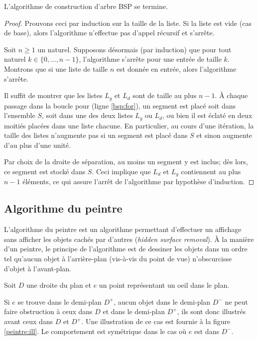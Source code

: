 \begin{prop}
  L'algorithme de construction d'arbre BSP se termine.
\end{prop}
\begin{proof}
  Prouvons ceci par induction sur la taille de la liste.
  Si la liste est vide (cas de base), alors l'algorithme n'effectue
  pas d'appel récursif et s'arrête.

  Soit $n\geq 1$ un naturel. Supposons désormais (par induction) que pour
  tout naturel $k\in\{0, \ldots, n-1\}$, l'algorithme s'arrête pour
  une entrée de taille $k$. Montrons que si une liste de taille $n$
  est donnée en entrée, alors l'algorithme s'arrête.

  Il suffit de montrer que les listes $L_g$ et $L_d$ sont de taille
  au plus $n-1$. \`{A} chaque passage dans la boucle pour (ligne \ref{bsp:for}), un segment
  est placé soit dans l'ensemble $S$, soit dans une des deux listes
  $L_g$ ou $L_d$, ou bien il est éclaté en deux moitiés placées
  dans une liste chacune. En particulier, au cours d'une itération,
  la taille des listes n'augmente pas si un segment est placé dans $S$
  et sinon augmente d'au plus d'une unité.

  Par choix de la droite de séparation,
  au moins un segment y est inclus; dès lors, ce segment est stocké
  dans $S$. Ceci implique que $L_d$ et $L_g$ contiennent au plus $n-1$
  éléments, ce qui assure l'arrêt de l'algorithme par hypothèse d'induction.
\end{proof}


\subsection{Algorithme du peintre}
L'algorithme du peintre est un algorithme permettant d'effectuer un
affichage sans afficher les objets cachés par d'autres (\emph{hidden surface
  removal}). \`{A} la manière d'un peintre, le principe de l'algorithme est
de dessiner les objets dans un ordre tel qu'aucun objet à l'arrière-plan
(vis-à-vis du point de vue) n'obscurcisse d'objet à l'avant-plan.

Soit $D$ une droite du plan et $e$ un point représentant un oeil dans
le plan.

Si $e$ se trouve dans le demi-plan $D^+$, aucun objet dans le
demi-plan $D^-$ ne peut faire obstruction à ceux dans $D$ et dans le
demi-plan $D^+$, ils sont donc \og{}illustrés\fg{} avant ceux dans $D$ et $D^+$.
Une illustration de ce cas est fournie à la figure \ref{peintre:ill}.
Le comportement est symétrique dans le cas où $e$ est dans $D^-$.

